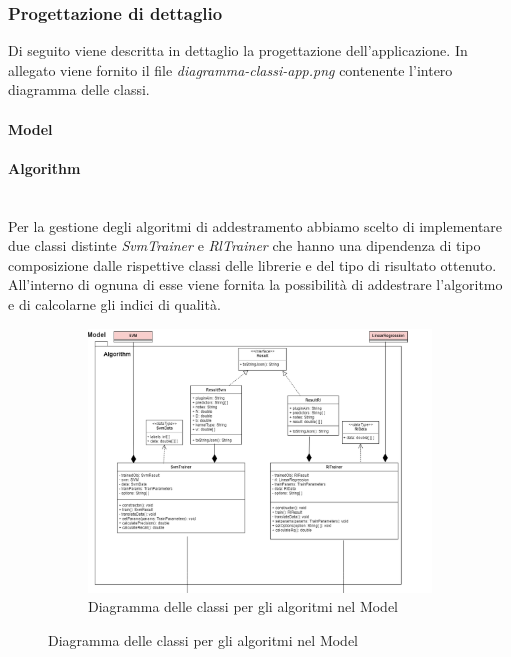 	\subsubsection{Progettazione di dettaglio}
		Di seguito viene descritta in dettaglio la progettazione dell'applicazione. In allegato viene fornito il file \textit{diagramma-classi-app.png} contenente l'intero diagramma delle classi.
		\paragraph{Model} \mbox{}
		\paragraph*{Algorithm} \mbox{} \\[1mm]
		Per la gestione degli algoritmi di addestramento abbiamo scelto di implementare due classi distinte \textit{SvmTrainer} e \textit{RlTrainer} che hanno una dipendenza di tipo composizione dalle rispettive classi delle librerie e del tipo di risultato ottenuto.
		All'interno di ognuna di esse viene fornita la possibilità di addestrare l'algoritmo e di calcolarne gli indici di qualità.
		\mbox{}
		\begin{landscape}
			\begin{figure}
				\begin{figure} [H]
					\includegraphics[width=\linewidth]{img/Diagrammi/algorithm-app.png}
					\caption{Diagramma delle classi per gli algoritmi nel Model}
				\end{figure}
			\end{figure}
		\end{landscape}
